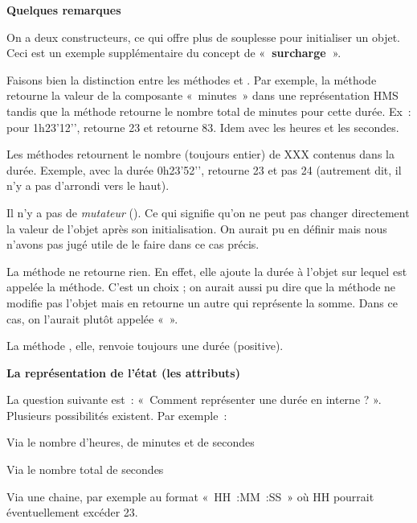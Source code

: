 \bigskip

{\bfseries
Quelques remarques}

\begin{liste}
	\item {
		On a deux constructeurs, ce qui offre plus de souplesse pour initialiser
		un objet. Ceci est un exemple supplémentaire du concept de
		«\textbf{~surcharge~}».}
	\item {
		Faisons bien la distinction entre les méthodes
		 et . Par
		exemple, la méthode  retourne la valeur
		de la composante «~minutes~» dans une représentation HMS tandis que la
		méthode  retourne le nombre total
		de minutes pour cette durée. Ex~: pour 1h23’12’’,
		 retourne 23 et
		 retourne 83. Idem avec les heures
		et les secondes.}
	\item {
		Les méthodes  retournent le nombre
		(toujours entier) de XXX contenus dans la durée. Exemple, avec la durée
		0h23’52'’, 
		retourne 23 et pas 24 (autrement dit, il n’y a pas d’arrondi vers le
		haut).}
	\item {
		Il n’y a pas de \textit{mutateur }(). Ce qui
		signifie qu’on ne peut pas changer directement la valeur de l’objet
		après son initialisation. On aurait pu en définir mais nous
		n'avons pas jugé utile de le faire dans ce cas
		précis.}
	\item {
		La méthode  ne retourne rien. En effet,
		elle ajoute la durée à l’objet sur lequel est appelée la méthode. C’est
		un choix ; on aurait aussi pu dire que la méthode ne modifie pas
		l’objet mais en retourne un autre qui représente la somme. Dans ce cas,
		on l’aurait plutôt appelée «~».}
	\item {
		La méthode , elle, renvoie toujours une
		durée (positive).}
\end{liste}

{\sffamily\bfseries
La représentation de l'état (les attributs)}

La question suivante est~: «~Comment représenter une durée en interne ?
». Plusieurs possibilités existent. Par exemple~:

\begin{liste}
	\item 
		Via le nombre d’heures, de minutes et de secondes
	\item 
		Via le nombre total de secondes
	\item 
		Via une chaine, par exemple au format «~HH~:MM~:SS~» où HH pourrait
		éventuellement excéder 23.
\end{liste}

